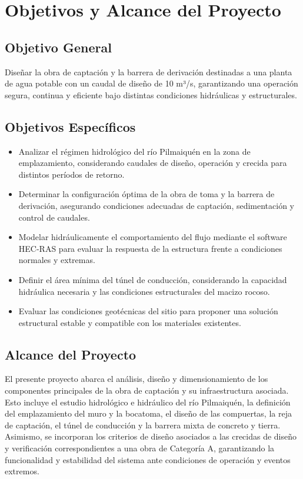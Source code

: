 \documentclass{article} %
\begin{document}
\newpage
\section{Objetivos y Alcance del Proyecto}

\subsection{Objetivo General}

Diseñar la obra de captación y la barrera de derivación destinadas a una planta de agua potable con un caudal de diseño de 10 m³/s, garantizando una operación segura, continua y eficiente bajo distintas condiciones hidráulicas y estructurales.

\subsection{Objetivos Específicos}

\begin{itemize}
    \item Analizar el régimen hidrológico del río Pilmaiquén en la zona de emplazamiento, considerando caudales de diseño, operación y crecida para distintos períodos de retorno.
    \item Determinar la configuración óptima de la obra de toma y la barrera de derivación, asegurando condiciones adecuadas de captación, sedimentación y control de caudales.
    \item Modelar hidráulicamente el comportamiento del flujo mediante el software HEC-RAS para evaluar la respuesta de la estructura frente a condiciones normales y extremas.
    \item Definir el área mínima del túnel de conducción, considerando la capacidad hidráulica necesaria y las condiciones estructurales del macizo rocoso.
    \item Evaluar las condiciones geotécnicas del sitio para proponer una solución estructural estable y compatible con los materiales existentes.
\end{itemize}

\subsection{Alcance del Proyecto}

El presente proyecto abarca el análisis, diseño y dimensionamiento de los componentes principales de la obra de captación y su infraestructura asociada. Esto incluye el estudio hidrológico e hidráulico del río Pilmaiquén, la definición del emplazamiento del muro y la bocatoma, el diseño de las compuertas, la reja de captación, el túnel de conducción y la barrera mixta de concreto y tierra.  
Asimismo, se incorporan los criterios de diseño asociados a las crecidas de diseño y verificación correspondientes a una obra de Categoría A, garantizando la funcionalidad y estabilidad del sistema ante condiciones de operación y eventos extremos.
\end{document}
